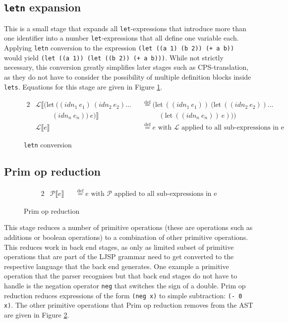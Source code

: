 \documentclass[11pt]{report}
\newcommand{\eqdef}{\stackrel{\text{def}}{=}}%
\begin{document}
\subsection{\texttt{letn} expansion}
This is a small stage that expands all \texttt{let}-expressions that introduce more than one identifier into a number \texttt{let}-expressions that all define one variable each. Applying \texttt{letn} conversion to the expression \texttt{(let ((a 1) (b 2)) (+ a b))} would yield \texttt{(let ((a 1)) (let ((b 2)) (+ a b)))}. While not strictly necessary, this conversion greatly simplifies later stages such as CPS-translation, as they do not have to consider the possibility of multiple definition blocks inside \texttt{lets}. Equations for this stage are given in Figure \ref{letnconversion}.

\begin{figure}[ht]
\begin{alignat*}{2}
&\mathcal{L}\llbracket (\text{let}\ ((idn_1\ e_1)\ (idn_2\ e_2)\dots &&\eqdef (\text{let}\ ((idn_1\ e_1))\ (\text{let}\ ((idn_2\ e_2)) \dots \\
&\hspace{1cm} (idn_n\ e_n))\ e)\rrbracket &&\hspace{1cm}(\text{let}\ ((idn_n\ e_n))\ e)))\\
&\mathcal{L}\llbracket e \rrbracket && \eqdef e\text{ with $\mathcal{L}$ applied to all sub-expressions in e}
\end{alignat*}
\caption{\texttt{letn} conversion}
\label{letnconversion}
\end{figure}

\subsection{Prim op reduction}
\begin{figure}[ht]
\begin{alignat*}{2}
&\mathcal{P}\llbracket e \rrbracket && \eqdef e\text{ with $\mathcal{P}$ applied to all sub-expressions in e}
\end{alignat*}
\caption{Prim op reduction}
\label{primopreduction}
\end{figure}

This stage reduces a number of primitive operations (these are operations such as additions or boolean operations) to a combination of other primitive operations. This reduces work in back end stages, as only as limited subset of primitive operations that are part of the LJSP grammar need to get converted to the respective language that the back end generates. One example a primitive operation that the parser recognises but that back end stages do not have to handle is the negation operator \texttt{neg} that switches the sign of a double. Prim op reduction reduces expressions of the form \texttt{(neg x)} to simple subtraction: \texttt{(- 0 x)}. The other primitive operations that Prim op reduction removes from the AST are given in Figure \ref{primopreduction}.
\end{document}
